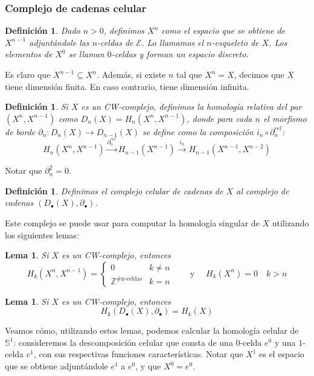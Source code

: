 \documentclass[12pt,a4paper]{article}
\newtheorem{lemma}[theorem]{Lema}
\newtheorem{definition}[theorem]{Definición}
\begin{document}
\subsubsection{Complejo de cadenas celular}
\begin{definition}
Dado $n > 0$, definimos $X^n$ como el espacio que se obtiene de $X^{n-1}$ adjuntándole las $n$-celdas de $\mathcal{E}$. Lo llamamos el \textit{$n$-esqueleto} de $X$. Los elementos de $X^0$ se llaman $0$-celdas y forman un espacio discreto.
\end{definition}
Es claro que $X^{n-1} \subseteq X^n$. Además, si existe $n$ tal que $X^n = X$, decimos que $X$ tiene dimensión finita. En caso contrario, tiene dimensión infinita.
\begin{definition}
Si $X$ es un CW-complejo, definimos la homología relativa del par $(X^n, X^{n-1})$ como $D_n(X) = H_n(X^n, X^{n-1})$, donde para cada $n$ el morfismo de borde $\partial_n: D_n(X) \rightarrow D_{n-1}(X)$ se define como la composición $i_n \circ \partial_n^{rel}$:
\[
H_n(X^n, X^{n-1}) \xrightarrow{\partial_n^{rel}} H_{n-1}(X^{n-1}) \xrightarrow{i_n} H_{n-1}(X^{n-1}, X^{n-2})
\]
\end{definition}
Notar que $\partial_n^2 = 0$.
\begin{definition}
Definimos el \textit{complejo celular de cadenas de $X$} al complejo de cadenas $(D_\bullet(X), \partial_\bullet)$.
\end{definition}
Este complejo se puede usar para computar la homología singular de $X$ utilizando los siguientes lemas:
\begin{lemma}
    Si $X$ es un CW-complejo, entonces
    \[
    H_k(X^n, X^{n-1}) =
    \begin{cases}
    0 & k \neq n\\[2mm]
    \mathbb{Z}^{\#\text{n-celdas}} & k = n
    \end{cases}
    \qquad \text{y } \quad
    H_k(X^n) = 0 \quad k > n
    \]
\end{lemma}
\begin{lemma}
    Si $X$ es un CW-complejo, entonces
    \[
    H_k(D_\bullet(X), \partial_\bullet) = H_k(X)
    \]
\end{lemma}
Veamos cómo, utilizando estos lemas, podemos calcular la homología celular de $\mathbb{S}^1$: consideremos la descomposición celular que consta de una $0$-celda $e^0$ y una $1$-celda $e^1$, con sus respectivas funciones características. Notar que $X^1$ es el espacio que se obtiene adjuntándole $e^1$ a $e^0$, y que $X^0 = e^0$.
\end{document}
